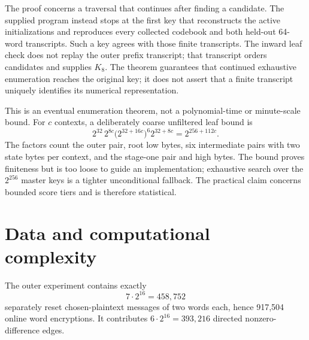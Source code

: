 \documentclass[10pt]{article}
\theoremstyle{plain}
\theoremstyle{definition}
\theoremstyle{remark}
\begin{document}
The proof concerns a traversal that continues after finding a candidate.  The
supplied program instead stops at the first key that reconstructs the active
initializations and reproduces every collected codebook and both held-out
64-word transcripts.  Such a key agrees with those finite transcripts.
The inward leaf check does not replay the outer prefix transcript; that
transcript orders candidates and supplies \(K_8\).
The theorem guarantees that continued exhaustive enumeration reaches the
original key; it does not assert that a finite transcript uniquely identifies
its numerical representation.

This is an eventual enumeration theorem, not a polynomial-time or
minute-scale bound.  For \(c\) contexts, a deliberately coarse unfiltered
leaf bound is
\begin{equation}
2^{32}\,2^{8c}\bigl(2^{32+16c}\bigr)^6 2^{32+8c}
=2^{256+112c}.
\label{eq:treecoarse}
\end{equation}
The factors count the outer pair, root low bytes, six intermediate pairs with
two state bytes per context, and the stage-one pair and high bytes.  The bound
proves finiteness but is too loose to guide an implementation; exhaustive search over the
\(2^{256}\) master keys is a tighter unconditional fallback.  The practical
claim concerns bounded score tiers and is therefore statistical.

\section{Data and computational complexity}
\label{sec:effort}

The outer experiment contains exactly
\begin{equation}
7\cdot2^{16}=458{,}752
\label{eq:outerqueries}
\end{equation}
separately reset chosen-plaintext messages of two words each, hence 917,504
online word encryptions.  It
contributes \(6\cdot2^{16}=393{,}216\) directed nonzero-difference edges.
\end{document}
